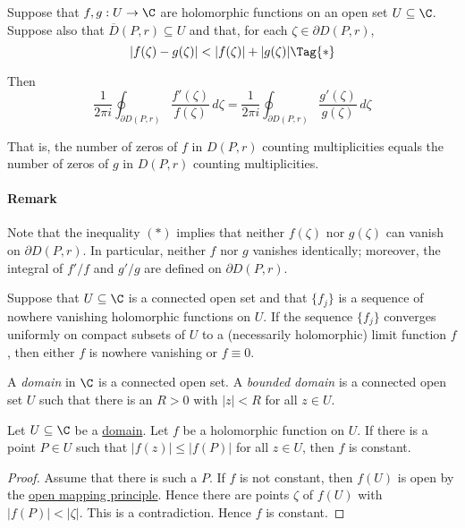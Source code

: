 \label{bf9c04f}

Suppose that $f,g:U\to\C$ are holomorphic functions on an open set
$U\subseteq\C$. Suppose also that $\overline D(P,r)\subseteq U$ and that, for
each $\zeta\in\partial D(P,r)$,
\begin{equation*}
  |f(\zeta)-g(\zeta)|<|f(\zeta)|+|g(\zeta)|\Tag{*}
\end{equation*}

Then
$$
  \frac1{2\pi i}\oint_{\partial D(P,r)}\frac{f'(\zeta)}{f(\zeta)}\,d\zeta
  =\frac1{2\pi i}\oint_{\partial D(P,r)}\frac{g'(\zeta)}{g(\zeta)}\,d\zeta
$$

That is, the number of zeros of $f$ in $D(P,r)$ counting multiplicities equals
the number of zeros of $g$ in $D(P,r)$ counting multiplicities.

\paragraph{Remark}

Note that the inequality $(*)$ implies that neither $f(\zeta)$ nor $g(\zeta)$
can vanish on $\partial D(P,r)$. In particular, neither $f$ nor $g$ vanishes
identically; moreover, the integral of $f'/f$ and $g'/g$ are defined on
$\partial D(P,r)$.

\label{a821cfc}

Suppose that $U\subseteq\C$ is a connected open set and that $\{f_j\}$ is a
sequence of nowhere vanishing holomorphic functions on $U$. If the sequence
$\{f_j\}$ converges uniformly on compact subsets of $U$ to a (necessarily
holomorphic) limit function $f$, then either $f$ is nowhere vanishing or
$f\equiv0$.

\label{f2be1bc}

A \textit{domain} in $\C$ is a connected open set. A \textit{bounded domain} is
a connected open set $U$ such that there is an $R>0$ with $|z|<R$ for all $z\in
U$.

\label{bfc4e84}

Let $U\subseteq\C$ be a \href{f2be1bc}{domain}. Let $f$ be a holomorphic
function on $U$. If there is a point $P\in U$ such that $|f(z)|\leq |f(P)|$ for
all $z\in U$, then $f$ is constant.

\begin{proof}
  Assume that there is such a $P$. If $f$ is not constant, then $f(U)$ is open
  by the \href{e5ecb18}{open mapping principle}. Hence there are points $\zeta$
  of $f(U)$ with $|f(P)|<|\zeta|$. This is a contradiction. Hence $f$ is
  constant.
\end{proof}

